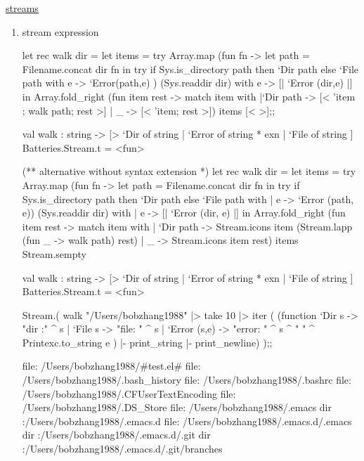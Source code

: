 

\href{http://mirror.ocamlcore.org/ocaml-tutorial.org/streams.html}{streams}

\begin{enumerate}
\item stream expression

 \begin{redcode}

let rec walk dir = 
    let items = try 
      Array.map (fun fn -> let path = Filename.concat dir fn in 
             try if Sys.is_directory path then `Dir path else `File path
             with e -> `Error(path,e) ) (Sys.readdir dir)
      with e -> [| `Error (dir,e) |] in 
      Array.fold_right 
        (fun item rest -> match item with 
            |`Dir path -> [< 'item ; walk path; rest >]
            | _ -> [< 'item; rest >]) items [< >];;

val walk :
  string ->
  [> `Dir of string | `Error of string * exn | `File of string ]
  Batteries.Stream.t = <fun>
  
(** alternative without syntax extension *)
let rec walk dir =
  let items =
    try
      Array.map
        (fun fn ->
           let path = Filename.concat dir fn   in
             try if Sys.is_directory path 
                  then `Dir path 
                  else `File path
             with | e -> `Error (path, e))
        (Sys.readdir dir)
    with | e -> [| `Error (dir, e) |]
  in
    Array.fold_right
      (fun item rest ->
         match item with
         | `Dir path ->
             Stream.icons item (Stream.lapp (fun _ -> walk path) rest)
         | _ -> Stream.icons item rest)
      items Stream.sempty

val walk :
  string ->
  [> `Dir of string | `Error of string * exn | `File of string ]
  Batteries.Stream.t = <fun>
            
Stream.( walk   "/Users/bobzhang1988"
  |> take 10 |> iter 
  (
  (function `Dir s -> "dir :" ^ s 
     | `File s -> "file: " ^ s 
     | `Error (s,e) -> "error: " ^ s ^ " " ^ Printexc.to_string e
     )  |- print_string |- print_newline)
  );;

file: /Users/bobzhang1988/#test.el#
file: /Users/bobzhang1988/.bash_history
file: /Users/bobzhang1988/.bashrc
file: /Users/bobzhang1988/.CFUserTextEncoding
file: /Users/bobzhang1988/.DS_Store
file: /Users/bobzhang1988/.emacs
dir :/Users/bobzhang1988/.emacs.d
file: /Users/bobzhang1988/.emacs.d/.emacs
dir :/Users/bobzhang1988/.emacs.d/.git
dir :/Users/bobzhang1988/.emacs.d/.git/branches
            

\end{redcode}
\end{enumerate}
